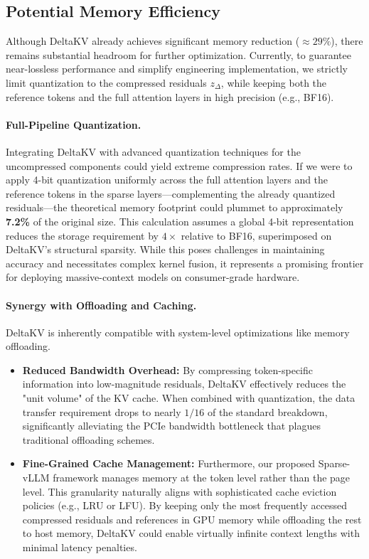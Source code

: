 \subsection{Potential Memory Efficiency}
\label{app:sect:mem_eff}

Although DeltaKV already achieves significant memory reduction ($\approx 29\%$), there remains substantial headroom for further optimization. Currently, to guarantee near-lossless performance and simplify engineering implementation, we strictly limit quantization to the compressed residuals $z_{\Delta}$, while keeping both the reference tokens and the full attention layers in high precision (e.g., BF16). 

\paragraph{Full-Pipeline Quantization.}
Integrating DeltaKV with advanced quantization techniques for the uncompressed components could yield extreme compression rates. If we were to apply 4-bit quantization uniformly across the full attention layers and the reference tokens in the sparse layers—complementing the already quantized residuals—the theoretical memory footprint could plummet to approximately \textbf{7.2\%} of the original size. This calculation assumes a global 4-bit representation reduces the storage requirement by $4\times$ relative to BF16, superimposed on DeltaKV's structural sparsity. While this poses challenges in maintaining accuracy and necessitates complex kernel fusion, it represents a promising frontier for deploying massive-context models on consumer-grade hardware.

\paragraph{Synergy with Offloading and Caching.}
DeltaKV is inherently compatible with system-level optimizations like memory offloading.
\begin{itemize}[nolistsep, left=0pt]
  \item \textbf{Reduced Bandwidth Overhead:} By compressing token-specific information into low-magnitude residuals, DeltaKV effectively reduces the "unit volume" of the KV cache. When combined with quantization, the data transfer requirement drops to nearly $1/16$ of the standard breakdown, significantly alleviating the PCIe bandwidth bottleneck that plagues traditional offloading schemes.
  
  \item \textbf{Fine-Grained Cache Management:} Furthermore, our proposed Sparse-vLLM framework manages memory at the token level rather than the page level. This granularity naturally aligns with sophisticated cache eviction policies (e.g., LRU or LFU). By keeping only the most frequently accessed compressed residuals and references in GPU memory while offloading the rest to host memory, DeltaKV could enable virtually infinite context lengths with minimal latency penalties.
\end{itemize}

